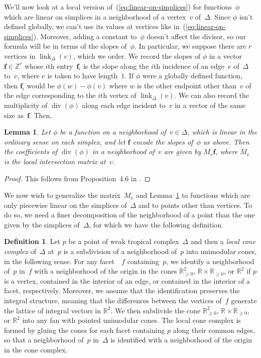 \documentclass[11pt]{amsart}
\newtheorem{lem}[thm]{Lemma}
\theoremstyle{definition}
\newtheorem{defn}[thm]{Definition}
\newcommand{\bff}{\mathbf f}
\newcommand{\defi}[1]{\emph{#1}}
\newcommand{\link}{\operatorname{link}}
\newcommand{\RR}{\mathbb R}
\newcommand{\ZZ}{\mathbb Z}
\renewcommand{\div}{\operatorname{div}}
\begin{document}
We'll now look at a local version of~(\ref{eq:linear-on-simplices}) for
functions~$\phi$ which are linear on simplices in a neighborhood of a vertex~$v$
of~$\Delta$. Since $\phi$ isn't defined globally, we can't use its values at
vertices like in~(\ref{eq:linear-on-simplices}). Moreover, adding a
constant to~$\phi$ doesn't affect the divisor, so our formula will be in terms of
the slopes of~$\phi$. In particular, we suppose there are $r$ vertices in
$\link_\Delta(v)$, which we order.
We record the slopes of $\phi$ in a vector $\bff \in \ZZ^r$ whose $i$th
entry~$\bff_i$ is the slope along the $i$th incidence of an edge~$e$ of~$\Delta$
to~$v$, where $e$ is taken to have length~$1$. If $\phi$ were a globally defined function, then $\bff_i$ would be
$\phi(w) - \phi(v)$
where $w$ is the other endpoint other than~$v$ of the edge corresponding to the
$i$th vertex of $\link_\Delta(v)$. We can also record the multiplicity of
$\div(\phi)$ along each edge incident to~$v$ in a vector of the same size
as~$\bff$. Then,
\begin{lem}\label{lem:local-intersection-matrix}
Let $\phi$ be a function on a neighborhood of~$v \in \Delta$, which is linear in
the ordinary sense on each simplex, and let $\bff$ encode the slopes of~$\phi$
as above. Then the coefficients of $\div(\phi)$ in a
neighborhood of~$v$ are given by $M_v \bff$, where $M_v$ is the local
intersection matrix at~$v$.
\end{lem}

\begin{proof}
This follows from Proposition~4.6 in \cite{cartwright-complexes}.
\end{proof}

We now wish to generalize the matrix~$M_v$ and
Lemma~\ref{lem:local-intersection-matrix} to functions which are only piecewise
linear on the simplices of~$\Delta$ and to points other than vertices. To do so,
we need a finer decomposition of the neighborhood of a point than the one given
by the simplices of~$\Delta$, for which we have the following definition.

\begin{defn}\label{def:local-cone-complex}
Let $p$ be a point of weak tropical complex~$\Delta$ and then a
\defi{local cone complex} of~$\Delta$ at~$p$ is a subdivision of a neighborhood
of~$p$ into unimodular cones, in the following sense. For any facet~~$f$
containing~$p$, we identify a neighborhood of~$p$ in~$f$ with a neighborhood of
the origin in the cones $\RR_{\geq 0}^2$, $\RR \times \RR_{\geq 0}$, or $\RR^2$
if $p$ is a vertex, contained in the interior of an edge, or contained in the
interior of a facet, respectively. Moreover, we assume that the identification
preserves the integral structure, meaning that the differences between the
vertices of~$f$ generate the lattice of integral vectors in $\RR^2$. We then
subdivide the cone $\RR_{\geq 0}^2$, $\RR \times \RR_{\geq 0}$, or $\RR^2$ into
any fan with pointed unimodular cones. The local cone complex is formed by
gluing the cones for each facet containing $p$ along their common edges, so that
a neighborhood of~$p$ in~$\Delta$ is identified with a neighborhood of the
origin in the cone complex.
\end{defn}
\end{document}
